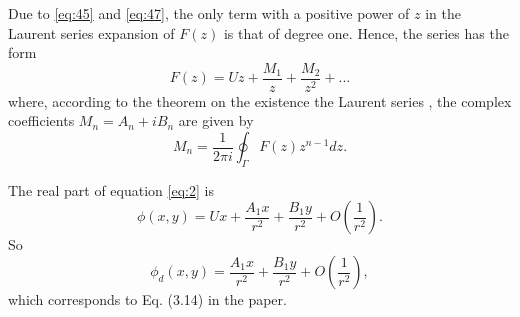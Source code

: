 \documentclass[11pt]{article}
\begin{document}
Due to \eqref{eq:45} and \eqref{eq:47}, the only term with a positive power of $z$ in the Laurent series expansion of $F(z)$ is that of degree one. Hence, the series has the form
\begin{equation}
  \label{eq:2}
  F(z) = U z + \frac{M_1}{z} + \frac{M_2}{z^2} + ...
\end{equation}
where, according to the theorem on the existence the Laurent series \cite{brown2014}, the complex coefficients $M_n = A_n + iB_n$ are given by
\begin{equation}
  \label{eq:3}
  M_n = \frac{1}{2\pi i}\oint_\Gamma F(z)z^{n-1}dz.
\end{equation}

The real part of equation \eqref{eq:2} is
\begin{equation}
  \label{eq:4}
  \phi(x,y) = U x + \frac{A_1 x}{r^2} + \frac{B_1 y}{r^2} + O\left(\frac{1}{r^2}\right).
\end{equation}
So
\begin{equation}
  \label{eq:4}
  \phi_d(x,y) = \frac{A_1 x}{r^2} + \frac{B_1 y}{r^2} + O\left(\frac{1}{r^2}\right),
\end{equation}
which corresponds to Eq. (3.14) in the paper.
\end{document}
